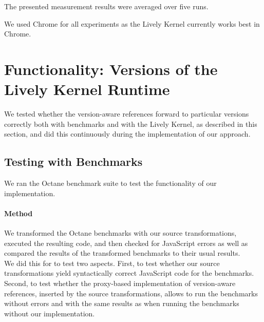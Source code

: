 The presented measurement results were averaged over five runs.

We used Chrome for all experiments as the Lively Kernel currently works best in Chrome.







\section{Functionality: Versions of the Lively Kernel Runtime} \label{sec:DISCUSSION:1}

We tested whether the version-aware references forward to particular versions correctly both with benchmarks and with the Lively Kernel, as described in this section, and did this continuously during the implementation of our approach.

\subsection{Testing with Benchmarks}

We ran the Octane benchmark suite to test the functionality of our implementation.

\paragraph{Method}
We transformed the Octane benchmarks with our source transformations, executed the resulting code, and then checked for JavaScript errors as well as compared the results of the transformed benchmarks to their usual results.\\
We did this for to test two aspects.
First, to test whether our source transformations yield syntactically correct JavaScript code for the benchmarks.
Second, to test whether the proxy-based implementation of version-aware references, inserted by the source transformations, allows to run the benchmarks without errors and with the same results as when running the benchmarks without our implementation.


